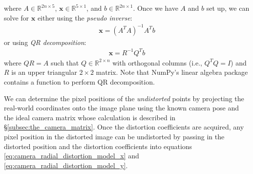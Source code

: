 \documentclass[11pt, letterpaper]{extarticle} %
\begin{document}
where $A \in \mathbb{R}^{2n \times 5}$, $\mathbf{x} \in \mathbb{R}^{5 \times 1}$, and $b \in \mathbb{R}^{2n \times 1}$. Once we have $A$ and $b$ set up, we can solve for $\mathbf{x}$ either using the \textit{pseudo inverse}:
\begin{align} \label{eq:psuedo_inverse}
    \mathbf{x} = (A^T A)^{-1} A^T b
\end{align}
or using \textit{QR decomposition}:
\begin{align} \label{eq:QR_decomposition_inverse}
    \mathbf{x} = R^{-1} Q^T b
\end{align}
where $QR = A$ such that $Q \in \mathbb{R}^{2 \times n}$  with orthogonal columns (i.e., $Q^T Q = I$) and $R$ is an upper triangular $2 \times 2$ matrix. Note that NumPy's linear algebra package contains a function to perform QR decomposition. 

We can determine the pixel positions of the \textit{undistorted} points by projecting the real-world coordinates onto the image plane using the known camera pose and the ideal camera matrix whose calculation is described in \S\ref{subsec:the_camera_matrix}. Once the distortion coefficients are acquired, any pixel position in the distorted image can be undistorted by passing in the distorted position and the distortion coefficients into equations \ref{eq:camera_radial_distortion_model_x} and \ref{eq:camera_radial_distortion_model_y}.
\end{document}
